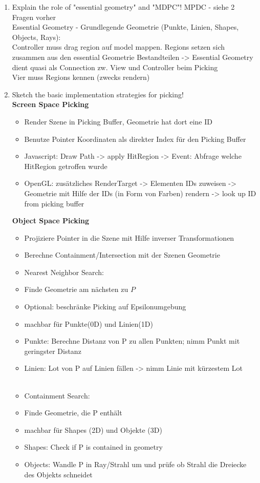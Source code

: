 \begin{enumerate}
	\item Explain the role of "essential geometry" and "MDPC"!
	MPDC - siehe 2 Fragen vorher\\
	Essential Geometry - Grundlegende Geometrie (Punkte, Linien, Shapes, Objects, Rays):\\
	Controller muss drag region auf model mappen. Regions setzen sich zusammen aus den essential Geometrie Bestandteilen -> Essential Geometry dient quasi als Connection zw. View und Controller beim Picking\\
	Vier muss Regions kennen (zwecks rendern)
	
	\item Sketch the basic implementation strategies for picking!\\
	\textbf{Screen Space Picking}
	\begin{itemize}
		\item Render Szene in Picking Buffer, Geometrie hat dort eine ID
		\item Benutze Pointer Koordinaten als direkter Index für den Picking Buffer
		\item Javascript: Draw Path -> apply HitRegion -> Event: Abfrage welche HitRegion getroffen wurde
		\item OpenGL: zusätzliches RenderTarget -> Elementen IDs zuweisen -> Geometrie mit Hilfe der IDs (in Form von Farben) rendern -> look up ID from picking buffer
	\end{itemize}
	\textbf{Object Space Picking}
	\begin{itemize}
		\item Projiziere Pointer in die Szene mit Hilfe inverser Transformationen
		\item Berechne Containment/Intersection mit der Szenen Geometrie
		\item Nearest Neighbor Search:
		\item Finde Geometrie am nächsten zu $P$
		\item Optional: beschränke Picking auf Epsilonumgebung
		\item machbar für Punkte(0D) und Linien(1D)
		\item Punkte: Berechne Distanz von P zu allen Punkten; nimm Punkt mit geringster Distanz
		\item Linien: Lot von P auf Linien fällen -> nimm Linie mit kürzestem Lot\\
		\\
		\item Containment Search:
		\item Finde Geometrie, die P enthält
		\item machbar für Shapes (2D) und Objekte (3D)
		\item Shapes: Check if P is contained in geometry
		\item Objects: Wandle P in Ray/Strahl um und prüfe ob Strahl die Dreiecke des Objekts schneidet
	\end{itemize}
	

\end{enumerate}
